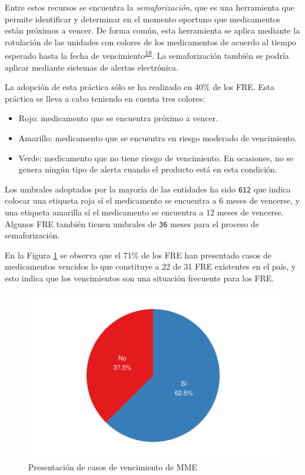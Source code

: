 \documentclass[
]{book}
\providecommand{\tightlist}{%
  \setlength{\itemsep}{0pt}\setlength{\parskip}{0pt}}
\begin{document}
Entre estos recursos se encuentra la \emph{semaforización}, que es una herramienta que permite identificar y determinar en el momento oportuno que medicamentos están próximos a vencer. De forma común, esta herramienta se aplica mediante la rotulación de las unidades con colores de los medicamentos de acuerdo al tiempo esperado hasta la fecha de vencimiento\textsuperscript{\protect\hyperlink{ref-HernandezVera2017}{18}}. La semaforización también se podría aplicar mediante sistemas de alertas electrónica.

La adopción de esta práctica sólo se ha realizado en 40\% de los FRE. Esta práctica se lleva a cabo teniendo en cuenta tres colores:

\begin{itemize}
\tightlist
\item
  Rojo: medicamento que se encuentra próximo a vencer.
\item
  Amarillo: medicamento que se encuentra en riesgo moderado de vencimiento.
\item
  Verde: medicamento que no tiene riesgo de vencimiento. En ocasiones, no se genera ningún tipo de alerta cuando el producto está en esta condición.
\end{itemize}

Los umbrales adoptados por la mayoría de las entidades ha sido \texttt{6\textbar{}12} que indica colocar una etiqueta roja sí el medicamento se encuentra a 6 meses de vencerse, y una etiqueta amarilla sí el medicamento se encuentra a 12 meses de vencerse. Algunos FRE también tienen umbrales de \texttt{3\textbar{}6} meses para el proceso de semaforización.

En la Figura \ref{fig:CasosVencimiento1} se observa que el 71\% de los FRE han presentado casos de medicamentos vencidos lo que constituye a 22 de 31 FRE existentes en el país, y esto indica que los vencimientos son una situación frecuente para los FRE.

\begin{figure}
\includegraphics[width=0.85\linewidth]{InformeFinal_files/figure-latex/CasosVencimiento1-1} \caption{Presentación de casos de vencimiento de MME}\label{fig:CasosVencimiento1}
\end{figure}
\end{document}
